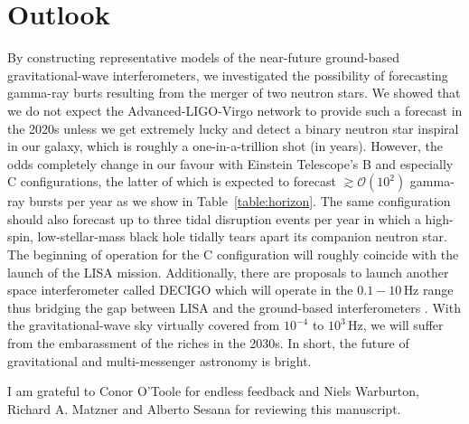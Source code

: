 \documentclass[prd,amsmath,amssymb,aps,floats,amsfonts,notitlepage,superscriptaddress,eqsecnum,nofootinbib,10pt]{revtex4-1}
\newcommand{\ord}{\mathcal{O}}
\begin{document}
\section{Outlook}
By constructing representative models of the near-future ground-based gravitational-wave interferometers, we investigated the possibility of
forecasting gamma-ray burts resulting from the merger of two neutron stars.
We showed that we do not expect the Advanced-LIGO-Virgo network to provide such a forecast in the 2020s unless we get extremely lucky
and detect a binary neutron star inspiral in our galaxy, which is roughly a one-in-a-trillion shot (in years). %
However, the odds completely change in our favour with Einstein Telescope's B and especially C configurations, 
the latter of which is expected to forecast $\gtrsim \ord(10^2)$ gamma-ray bursts per year as we show in Table~\ref{table:horizon}. 
The same configuration should also forecast up to three tidal disruption events per year in which a high-spin, low-stellar-mass
black hole tidally tears apart its companion neutron star.
The beginning of operation for the C configuration will roughly coincide with the launch of the LISA mission.
Additionally, there are proposals to launch another space interferometer called DECIGO which will operate
in the $0.1 - 10\,$Hz range thus bridging the gap between LISA and the ground-based interferometers \cite{Sato:2009zzb, Kawamura:2006zz}.
With the gravitational-wave sky virtually covered from $10^{-4}$ to $10^3\,$Hz, we will suffer from the 
embarassment of the riches in the 2030s. In short, the future of gravitational and multi-messenger astronomy is bright.


\acknowledgements 
I am grateful to Conor O'Toole for endless feedback and Niels Warburton, Richard A. Matzner and Alberto Sesana for reviewing this manuscript.
 
 

%


 
 
 
 
 
 
 
\end{document}

